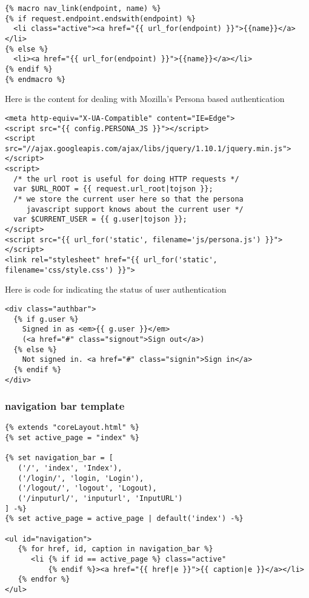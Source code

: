 \documentclass[11pt]{article}
\begin{document}
\begin{verbatim}
{% macro nav_link(endpoint, name) %}
{% if request.endpoint.endswith(endpoint) %}
  <li class="active"><a href="{{ url_for(endpoint) }}">{{name}}</a></li>
{% else %}
  <li><a href="{{ url_for(endpoint) }}">{{name}}</a></li>
{% endif %}
{% endmacro %}
\end{verbatim}

Here is the content for dealing with Mozilla's Persona based
authentication

\begin{verbatim}
<meta http-equiv="X-UA-Compatible" content="IE=Edge">
<script src="{{ config.PERSONA_JS }}"></script>
<script src="//ajax.googleapis.com/ajax/libs/jquery/1.10.1/jquery.min.js"></script>
<script>
  /* the url root is useful for doing HTTP requests */
  var $URL_ROOT = {{ request.url_root|tojson }};
  /* we store the current user here so that the persona
     javascript support knows about the current user */
  var $CURRENT_USER = {{ g.user|tojson }};
</script>
<script src="{{ url_for('static', filename='js/persona.js') }}"></script>
<link rel="stylesheet" href="{{ url_for('static', filename='css/style.css') }}">
\end{verbatim}
 
Here is code for indicating the status of user authentication 

\begin{verbatim}
<div class="authbar">
  {% if g.user %}
    Signed in as <em>{{ g.user }}</em>
    (<a href="#" class="signout">Sign out</a>)
  {% else %}
    Not signed in. <a href="#" class="signin">Sign in</a>
  {% endif %}
</div>
\end{verbatim}
\subsubsection{navigation bar template}
\label{sec-7-4-2}


\begin{verbatim}
{% extends "coreLayout.html" %}
{% set active_page = "index" %}

{% set navigation_bar = [
   ('/', 'index', 'Index'),
   ('/login/', 'login, 'Login'),
   ('/logout/', 'logout', 'Logout),
   ('/inputurl/', 'inputurl', 'InputURL')
] -%}
{% set active_page = active_page | default('index') -%}

<ul id="navigation">
   {% for href, id, caption in navigation_bar %}
      <li {% if id == active_page %} class="active" 
          {% endif %}><a href="{{ href|e }}">{{ caption|e }}</a></li>
   {% endfor %}
</ul>
\end{verbatim}
\end{document}
